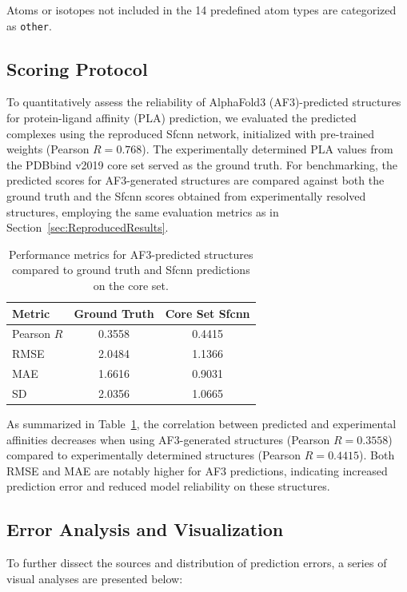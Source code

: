 \documentclass[unnumsec,webpdf,contemporary,large]{oup-authoring-template}
\theoremstyle{thmstyleone}%
\theoremstyle{thmstyletwo}%
\theoremstyle{thmstylethree}%
\begin{document}
Atoms or isotopes not included in the 14 predefined atom types are categorized as \texttt{other}.

\subsection{Scoring Protocol}
To quantitatively assess the reliability of AlphaFold3 (AF3)-predicted structures 
for protein-ligand affinity (PLA) prediction, we evaluated the predicted complexes 
using the reproduced Sfcnn network, initialized with pre-trained weights 
(Pearson $R = 0.768$). The experimentally determined PLA values from the PDBbind 
v2019 core set served as the ground truth. 
For benchmarking, the predicted scores for AF3-generated structures are compared 
against both the ground truth and the Sfcnn scores obtained from experimentally 
resolved structures, employing the same evaluation metrics as 
in Section~\ref{sec:ReproducedResults}.

\begin{table}[H]
\centering
\caption{Performance metrics for AF3-predicted structures compared to ground truth and Sfcnn predictions on the core set.}
\label{tab:af3_metrics}
\begin{tabular}{lcc}
\toprule
Metric & Ground Truth & Core Set Sfcnn \\
\midrule
Pearson $R$ & 0.3558 & 0.4415 \\
RMSE        & 2.0484 & 1.1366 \\
MAE         & 1.6616 & 0.9031 \\
SD          & 2.0356 & 1.0665 \\
\bottomrule
\end{tabular}
\end{table}

As summarized in Table~\ref{tab:af3_metrics}, the correlation between predicted and experimental affinities decreases when using AF3-generated structures (Pearson $R = 0.3558$) compared to experimentally determined structures (Pearson $R = 0.4415$). Both RMSE and MAE are notably higher for AF3 predictions, indicating increased prediction error and reduced model reliability on these structures.

\subsection{Error Analysis and Visualization}
To further dissect the sources and distribution of prediction errors, 
a series of visual analyses are presented below:
\end{document}
